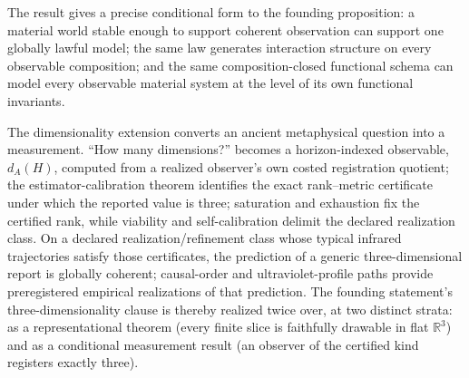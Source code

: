 \documentclass[11pt]{article}
\theoremstyle{definition}
\begin{document}
The result gives a precise conditional form to the founding proposition: a material world stable enough to support coherent observation can support one globally lawful model; the same law generates interaction structure on every observable composition; and the same composition-closed functional schema can model every observable material system at the level of its own functional invariants.

The dimensionality extension converts an ancient metaphysical question into a measurement. ``How many dimensions?'' becomes a horizon-indexed observable, $d_A(H)$, computed from a realized observer's own costed registration quotient; the estimator-calibration theorem identifies the exact rank--metric certificate under which the reported value is three; saturation and exhaustion fix the certified rank, while viability and self-calibration delimit the declared realization class. On a declared realization/refinement class whose typical infrared trajectories satisfy those certificates, the prediction of a generic three-dimensional report is globally coherent; causal-order and ultraviolet-profile paths provide preregistered empirical realizations of that prediction. The founding statement's three-dimensionality clause is thereby realized twice over, at two distinct strata: as a representational theorem (every finite slice is faithfully drawable in flat $\mathbb{R}^3$) and as a conditional measurement result (an observer of the certified kind registers exactly three).
\end{document}
